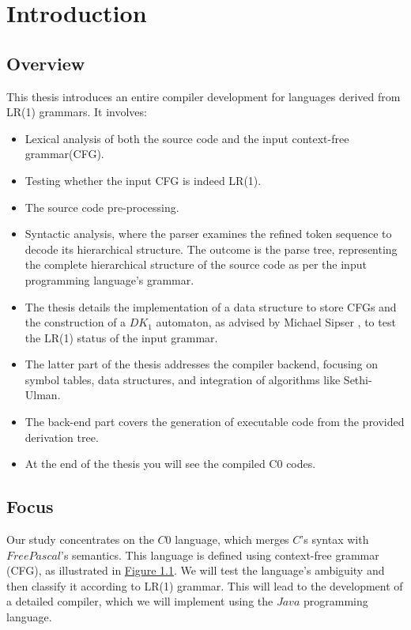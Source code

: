 \chapter{Introduction}\label{ch:Introduction}

\section*{Overview}
This thesis introduces an entire compiler development for languages derived from LR(1) grammars. It involves:

\begin{itemize}
    \item Lexical analysis of both the source code and the input context-free grammar(CFG).
    \item Testing whether the input CFG is indeed LR(1).
    \item The source code pre-processing.
    \item Syntactic analysis, where the parser examines the refined token sequence to decode its hierarchical structure. The outcome is the parse tree, representing the complete hierarchical structure of the source code as per the input programming language's grammar.
    \item The thesis details the implementation of a data structure to store CFGs and the construction of a \({DK_{1}}\) automaton, as advised by Michael Sipser \cite{sipser}, to test the LR(1) status of the input grammar.
    \item The latter part of the thesis addresses the compiler backend, focusing on symbol tables, data structures, and integration of algorithms like Sethi-Ulman.
    \item The back-end part covers the generation of executable code from the provided derivation tree.
    \item At the end of the thesis you will see the compiled C0 codes.
\end{itemize}

\section*{Focus}
Our study concentrates on the \(C0\) language, which merges \(C\)'s syntax with \(Free Pascal\)'s semantics. This language is defined using context-free grammar (CFG), as illustrated in \hyperref[fig:grammar_c0]{Figure 1.1}. We will test the language's ambiguity and then classify it according to LR(1) grammar. This will lead to the development of a detailed compiler, which we will implement using the \(Java\) programming language.

